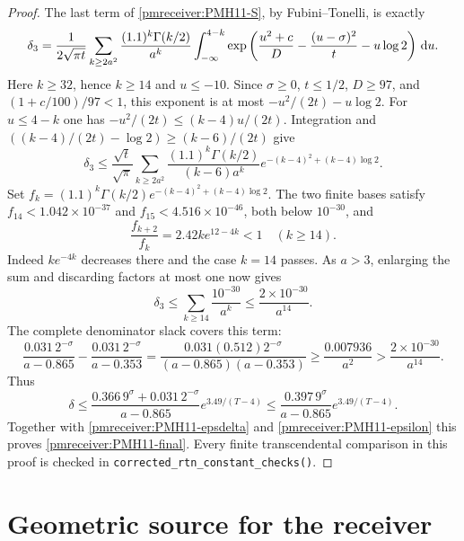 \documentclass[11pt]{article}
\begin{document}
\begin{proof}
The last term of \eqref{pmreceiver:PMH11-S}, by Fubini--Tonelli, is exactly
\[
 \delta_3=\frac1{2\sqrt{\pi t}}
 \sum_{k\ge2a^2}\frac{(1.1)^k\Gamma(k/2)}{a^k}
 \int_{-\infty}^{4-k}
 \exp\left(\frac{u^2+c}{D}-\frac{(u-\sigma)^2}{t}
                          -u\log2\right)\,\mathrm d u.
\]
Here $k\ge32$, hence $k\ge14$ and $u\le-10$. Since
$\sigma\ge0$, $t\le1/2$, $D\ge97$, and
$(1+c/100)/97<1$, this exponent is at most
$-u^2/(2t)-u\log2$. For $u\le4-k$ one has
$-u^2/(2t)\le(k-4)u/(2t)$. Integration and
$((k-4)/(2t)-\log2)\ge(k-6)/(2t)$ give
\[
 \delta_3\le\frac{\sqrt t}{\sqrt\pi}
 \sum_{k\ge2a^2}\frac{(1.1)^k\Gamma(k/2)}{(k-6)a^k}
            e^{-(k-4)^2+(k-4)\log2}.
\]
Set $f_k=(1.1)^k\Gamma(k/2)e^{-(k-4)^2+(k-4)\log2}$.
The two finite bases satisfy $f_{14}<1.042\times10^{-37}$ and
$f_{15}<4.516\times10^{-46}$, both below $10^{-30}$, and
\[
 \frac{f_{k+2}}{f_k}=2.42k e^{12-4k}<1\quad(k\ge14).
\]
Indeed $k e^{-4k}$ decreases there and the case $k=14$ passes.
As $a>3$, enlarging the sum and discarding factors at most one
now gives
\begin{equation}\label{pmreceiver:PMH11-delta3}
 \delta_3\le\sum_{k\ge14}\frac{10^{-30}}{a^k}
       \le\frac{2\times10^{-30}}{a^{14}}.
\end{equation}
The complete denominator slack covers this term:
\[
 \frac{0.031\,2^{-\sigma}}{a-0.865}
 -\frac{0.031\,2^{-\sigma}}{a-0.353}
 =\frac{0.031(0.512)2^{-\sigma}}{(a-0.865)(a-0.353)}
 \ge\frac{0.007936}{a^2}
 >\frac{2\times10^{-30}}{a^{14}}.
\]
Thus
\[
 \delta\le\frac{0.366\,9^\sigma+0.031\,2^{-\sigma}}
                  {a-0.865}e^{3.49/(T-4)}
 \le\frac{0.397\,9^\sigma}{a-0.865}e^{3.49/(T-4)}.
\]
Together with \eqref{pmreceiver:PMH11-epsdelta} and \eqref{pmreceiver:PMH11-epsilon}
this proves \eqref{pmreceiver:PMH11-final}. Every finite transcendental
comparison in this proof is checked in
\texttt{corrected\_rtn\_constant\_checks()}.
\end{proof}


\section{Geometric source for the receiver}
\end{document}
